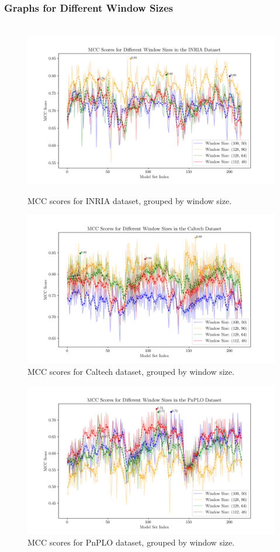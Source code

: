 \subsubsection{Graphs for Different Window Sizes}

\begin{figure}\
    \centering
    \includegraphics[width=0.9\linewidth]{../images/mcc_windows_INRIA.png}
    \caption{
        MCC scores for INRIA dataset, grouped by window size.
    }
    \label{fig:window_size_inria}
\end{figure}
\begin{figure}
    \centering
    \includegraphics[width=0.9\linewidth]{../images/mcc_windows_caltech_30.png}
    \caption{
        MCC scores for Caltech dataset, grouped by window size.
    }
    \label{fig:window_size_caltech}

\end{figure}
\begin{figure}
    \centering
    \includegraphics[width=0.9\linewidth]{../images/mcc_windows_PnPLO.png}
    \caption{
        MCC scores for PnPLO dataset, grouped by window size.
    }
    \label{fig:window_size_pnplo}
\end{figure}

